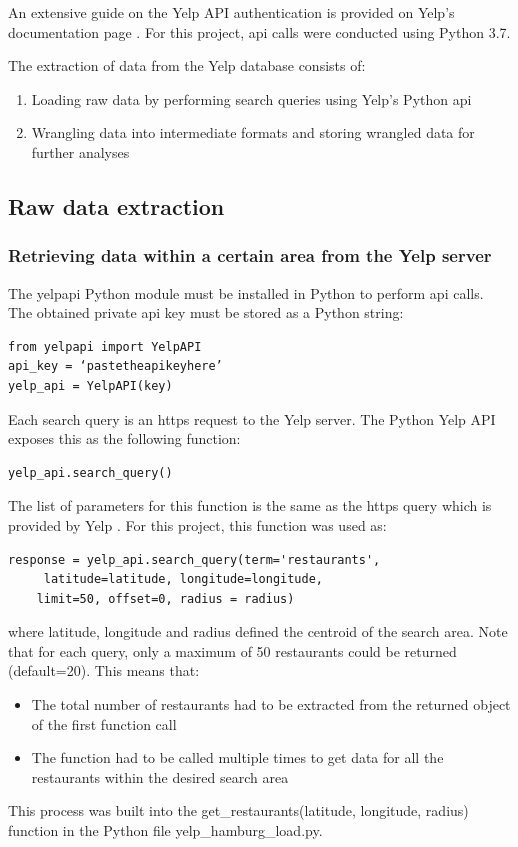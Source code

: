\documentclass[a4paper, 11pt, oneside]{Thesis}  %
\begin{document}
An extensive guide on the Yelp API authentication is provided on Yelp’s documentation page \cite{Yelp.Fusion.Authentication}.
For this project, \ac{api} calls were conducted using Python 3.7.

The extraction of data from the Yelp database consists of:
\begin{enumerate}
\item Loading raw data by performing search queries using Yelp’s Python \ac{api}
\item Wrangling data into intermediate formats and storing wrangled data for further analyses
\end{enumerate}

\subsection{Raw data extraction}

\subsubsection{Retrieving data within a certain area from the Yelp server}
\label{retrieving_data_within_a_certain_area}

The yelpapi Python module \cite{GeoffreyFairchild.11.07.2018} must be installed in Python to perform \ac{api} calls. The obtained private \ac{api} key must be stored as a Python string:

\begin{verbatim}
from yelpapi import YelpAPI
api_key = ‘pastetheapikeyhere’
yelp_api = YelpAPI(key)
\end{verbatim}

Each search query is an https request to the Yelp server. The Python Yelp API exposes this as the following function:
\begin{verbatim}
yelp_api.search_query()
\end{verbatim}

The list of parameters for this function is the same as the https query which is provided by Yelp \cite{yelp.businesses.search}. For this project, this function was used as:
\begin{verbatim}
response = yelp_api.search_query(term='restaurants',
	 latitude=latitude, longitude=longitude, 
	limit=50, offset=0, radius = radius)
\end{verbatim}
where latitude, longitude and radius defined the centroid of the search area.
Note that for each query, only a maximum of 50 restaurants could be returned (default=20). This means that:
\begin{itemize}
\item The total number of restaurants had to be extracted from the returned object of the first function call
\item The function had to be called multiple times to get data for all the restaurants within the desired search area
\end{itemize}
This process was built into the get\_restaurants(latitude, longitude, radius) function in the Python file yelp\_hamburg\_load.py.
\end{document}
